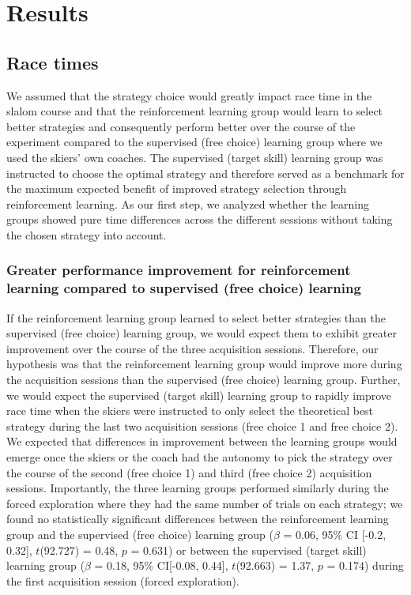 \documentclass[pdflatex,sn-nature]{sn-jnl}%
\theoremstyle{thmstyleone}%
\theoremstyle{thmstyletwo}%
\theoremstyle{thmstylethree}%
\begin{document}
\section{Results}

\subsection{Race times}\label{result_racetime}
We assumed that the strategy choice would greatly impact race time in the slalom course and that the reinforcement learning group would learn to select better strategies and consequently perform better over the course of the experiment compared to the supervised (free choice) learning group where we used the skiers' own coaches. The supervised (target skill) learning group was instructed to choose the optimal strategy and therefore served as a benchmark for the maximum expected benefit of improved strategy selection through reinforcement learning. As our first step, we analyzed whether the learning groups showed pure time differences across the different sessions without taking the chosen strategy into account. 

\subsubsection{Greater performance improvement for  reinforcement learning  compared to supervised (free choice) learning}\label{result_racetime_acquisition}
If the reinforcement learning group learned to select better strategies than the supervised (free choice) learning group, we would expect them to exhibit greater improvement over the course of the three acquisition sessions. Therefore, our hypothesis was that the reinforcement learning group would improve more during the acquisition sessions than the supervised (free choice) learning group. Further, we would expect the supervised (target skill) learning group to rapidly improve race time when the skiers were instructed to only select the theoretical best strategy during the last two acquisition sessions (free choice 1 and free choice 2). 
We expected that differences in improvement between the learning groups would emerge once the skiers or the coach had the autonomy to pick the strategy over the course of the second (free choice 1) and third (free choice 2) acquisition sessions. Importantly, the three learning groups performed similarly during the forced exploration where they had the same number of trials on each strategy; we found no statistically significant differences between the reinforcement learning group and the supervised (free choice) learning group ($\beta$ = 0.06, 95\% CI [-0.2, 0.32], $t$(92.727) = 0.48, $p$ = 0.631) or between the supervised (target skill) learning group ($\beta$ = 0.18, 95\% CI[-0.08, 0.44], $t$(92.663) = 1.37, $p$ = 0.174) during the first acquisition session (forced exploration).  
\end{document}
